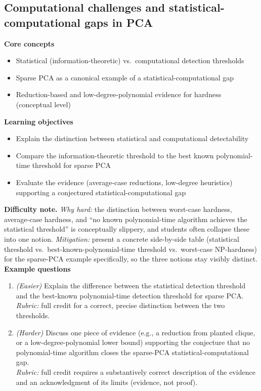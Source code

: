 \documentclass[11pt]{article}
\begin{document}
\subsection{Computational challenges and statistical-computational gaps in PCA}
\textbf{Core concepts}
\begin{itemize}[nosep]
\item Statistical (information-theoretic) vs.\ computational detection thresholds
\item Sparse PCA as a canonical example of a statistical-computational gap
\item Reduction-based and low-degree-polynomial evidence for hardness (conceptual level)
\end{itemize}
\textbf{Learning objectives}
\begin{itemize}[nosep]
\item Explain the distinction between statistical and computational detectability
\item Compare the information-theoretic threshold to the best known polynomial-time threshold for sparse PCA
\item Evaluate the evidence (average-case reductions, low-degree heuristics) supporting a conjectured statistical-computational gap
\end{itemize}
\textbf{Difficulty note.} \emph{Why hard:} the distinction between worst-case hardness, average-case hardness, and ``no known polynomial-time algorithm achieves the statistical threshold'' is conceptually slippery, and students often collapse these into one notion. \emph{Mitigation:} present a concrete side-by-side table (statistical threshold vs.\ best-known-polynomial-time threshold vs.\ worst-case NP-hardness) for the sparse-PCA example specifically, so the three notions stay visibly distinct.\\[4pt]
\textbf{Example questions}
\begin{enumerate}[nosep]
\item \emph{(Easier)} Explain the difference between the statistical detection threshold and the best-known polynomial-time detection threshold for sparse PCA. \\
\emph{Rubric:} full credit for a correct, precise distinction between the two thresholds.
\item \emph{(Harder)} Discuss one piece of evidence (e.g., a reduction from planted clique, or a low-degree-polynomial lower bound) supporting the conjecture that no polynomial-time algorithm closes the sparse-PCA statistical-computational gap. \\
\emph{Rubric:} full credit requires a substantively correct description of the evidence and an acknowledgment of its limits (evidence, not proof).
\end{enumerate}
\end{document}
